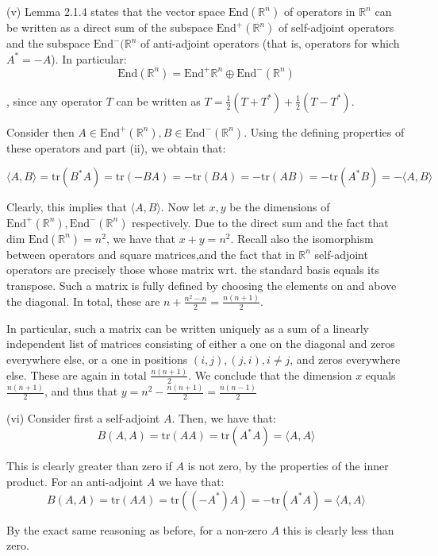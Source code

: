 \begin{solution}
    (v) Lemma 2.1.4 states that the vector space $\text{End}(\mathbb{R}^n)$ of operators in $\mathbb{R}^n$ can be written as a direct sum of the subspace $\text{End}^+(\mathbb{R}^n)$ of self-adjoint operators and the subspace $\text{End}^-(\mathbb{R}^n$ of anti-adjoint operators (that is, operators for which $A^* = -A$). In particular:
    $$\text{End}(\mathbb{R}^n) = \text{End}^+\mathbb{R}^n \oplus \text{End}^-(\mathbb{R}^n)$$

    , since any operator $T$ can be written as $T = \frac{1}{2}(T+T^*) + \frac{1}{2}(T-T^*)$.

    Consider then $A \in \text{End}^+(\mathbb{R}^n), B \in \text{End}^-(\mathbb{R}^n)$. Using the defining properties of these operators and part (ii), we obtain that:

    $$\langle A, B \rangle = \text{tr}(B^*A) = \text{tr}(-BA) = -\text{tr}(BA) = -\text{tr}(AB) = -\text{tr}(A^*B) = -\langle A, B \rangle$$

    Clearly, this implies that $\langle A, B \rangle$. Now let $x, y$ be the dimensions of $\text{End}^+(\mathbb{R}^n), \text{End}^-(\mathbb{R}^n)$ respectively. Due to the direct sum and the fact that $\text{dim End}(\mathbb{R}^n) = n^2$, we have that $x+y = n^2$. Recall also the isomorphism between operators and square matrices,and the fact that in $\mathbb{R}^n$ self-adjoint operators are precisely those whose matrix wrt. the standard basis equals its transpose. Such a matrix is fully defined by choosing the elements on and above the diagonal. In total, these are $n + \frac{n^2 - n}{2} = \frac{n(n+1)}{2}$. 
    
    In particular, such a matrix can be written uniquely as a sum of a linearly independent list of matrices consisting of either a one on the diagonal and zeros everywhere else, or a one in positions $(i, j), (j, i), i \neq j$, and zeros everywhere else. These are again in total $\frac{n(n+1)}{2}$. We conclude that the dimension $x$ equals $\frac{n(n+1)}{2}$, and thus that $y = n^2 - \frac{n(n+1)}{2} = \frac{n(n-1)}{2}$

    (vi) Consider first a self-adjoint $A$. Then, we have that:
    $$B(A, A) = \text{tr}(AA) = \text{tr}(A^*A) = \langle A, A \rangle$$

    This is clearly greater than zero if $A$ is not zero, by the properties of the inner product. For an anti-adjoint $A$ we have that:
    $$B(A, A) = \text{tr}(AA) = \text{tr}((-A^*)A) = -\text{tr}(A^*A) = \langle A, A \rangle$$

    By the exact same reasoning as before, for a non-zero $A$ this is clearly less than zero.


\end{solution}

